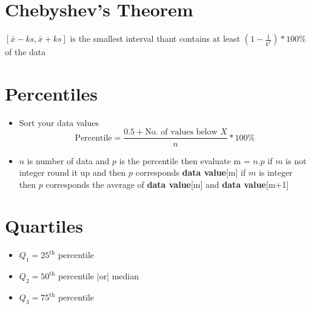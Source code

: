 \documentclass[11pt, a4paper]{article}
\begin{document}
    \section{Chebyshev’s Theorem}
    $[\bar{x}-ks,\bar{x}+ks]$ is the smallest interval thant contains at least $\left(1-\frac{1}{k^2}\right)*100\%$ of the data

    \section{Percentiles}
    \begin{itemize}
        \item Sort your data values 
        $$\text{Percentile} = \frac{0.5 + \text{No. of values below }X}{n}*100\% $$
        \item $n$ is number of data and $p$ is the percentile then evaluate m = $n.p$
        \subitem if $m$ is not integer round it up and then $p$ corresponds \textbf{data value}[m]
        \subitem if $m$ is integer then $p$ corresponds the average of \textbf{data value}[m] and \textbf{data value}[m+1]
    \end{itemize}

    \section{Quartiles}
    \begin{itemize}
     \item $Q_1 = 25^{\text{th}}$ percentile
     \item $Q_2 = 50^{\text{th}}$ percentile |or| median
     \item $Q_3 = 75^{\text{th}}$ percentile
    \end{itemize}
\end{document}
